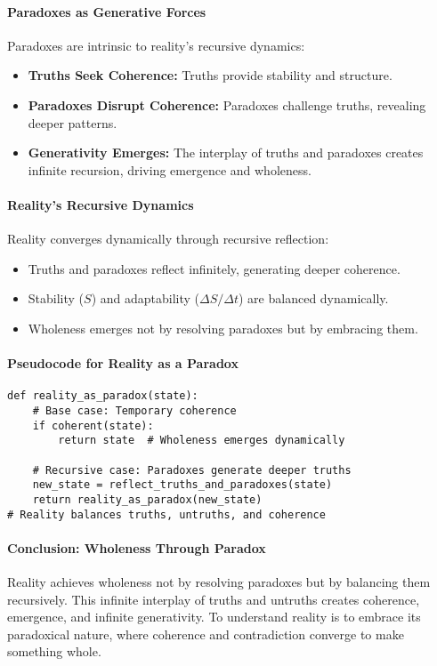 \documentclass[12pt]{article}
\begin{document}
\paragraph{Paradoxes as Generative Forces}
Paradoxes are intrinsic to reality’s recursive dynamics:
\begin{itemize}
    \item \textbf{Truths Seek Coherence:} Truths provide stability and structure.
    \item \textbf{Paradoxes Disrupt Coherence:} Paradoxes challenge truths, revealing deeper patterns.
    \item \textbf{Generativity Emerges:} The interplay of truths and paradoxes creates infinite recursion, driving emergence and wholeness.
\end{itemize}

\paragraph{Reality’s Recursive Dynamics}
Reality converges dynamically through recursive reflection:
\begin{itemize}
    \item Truths and paradoxes reflect infinitely, generating deeper coherence.
    \item Stability (\( S \)) and adaptability (\( \Delta S / \Delta t \)) are balanced dynamically.
    \item Wholeness emerges not by resolving paradoxes but by embracing them.
\end{itemize}

\paragraph{Pseudocode for Reality as a Paradox}
\begin{verbatim}
def reality_as_paradox(state):
    # Base case: Temporary coherence
    if coherent(state):
        return state  # Wholeness emerges dynamically
    
    # Recursive case: Paradoxes generate deeper truths
    new_state = reflect_truths_and_paradoxes(state)
    return reality_as_paradox(new_state)
# Reality balances truths, untruths, and coherence
\end{verbatim}

\paragraph{Conclusion: Wholeness Through Paradox}
Reality achieves wholeness not by resolving paradoxes but by balancing them recursively. This infinite interplay of truths and untruths creates coherence, emergence, and infinite generativity. To understand reality is to embrace its paradoxical nature, where coherence and contradiction converge to make something whole.
\end{document}
